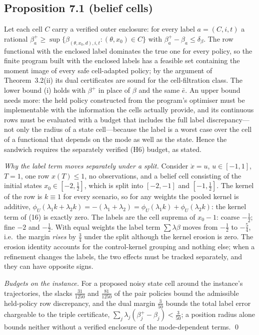 \documentclass[11pt,a4paper]{article}
\theoremstyle{plain}
\theoremstyle{definition}
\theoremstyle{remark}
\newcommand{\ebar}{\bar e}
\newcommand{\tfr}[2]{\tfrac{#1}{#2}}
\begin{document}
\subsection{Proposition 7.1 (belief cells)}
Let each cell $C$ carry a verified outer enclosure: for every label $a=(C,i,t)$ a rational $\beta_a^+\ge\sup\{\beta_{(\theta,x_0,d),i,t}:(\theta,x_0)\in C\}$ with $\beta^+_a-\beta_a\le\delta_\beta$. The row functional with the enclosed label dominates the true one for every policy, so the finite program built with the enclosed labels has a feasible set containing the moment image of every safe cell-adapted policy; by the argument of Theorem~3.2(ii) its dual certificates are sound for the cell-filtration class. The lower bound (i) holds with $\beta^+$ in place of $\beta$ and the same $\ebar$. An upper bound needs more: the held policy constructed from the program's optimiser must be implementable with the information the cells actually provide, and its continuous rows must be evaluated with a budget that includes the full label discrepancy---not only the radius of a state cell---because the label is a worst case over the cell of a functional that depends on the mode as well as the state. Hence the sandwich requires the separately verified (H6) budget, as stated.

\emph{Why the label term moves separately under a split.} Consider $\dot x=u$, $u\in[-1,1]$, $T=1$, one row $x(T)\le1$, no observations, and a belief cell consisting of the initial states $x_0\in[-2,\tfr12]$, which is split into $[-2,-1]$ and $[-1,\tfr12]$. The kernel of the row is $k\equiv1$ for every scenario, so for any weights the pooled kernel is additive, $\phi_U(\lambda_1k+\lambda_2k)=-(\lambda_1+\lambda_2)=\phi_U(\lambda_1k)+\phi_U(\lambda_2k)$: the kernel term of (16) is exactly zero. The labels are the cell suprema of $x_0-1$: coarse $-\tfr12$; fine $-2$ and $-\tfr12$. With equal weights the label term $\sum\lambda\beta$ moves from $-\tfr12$ to $-\tfr54$, i.e.\ the margin \emph{rises} by $\tfr34$ under the split although the kernel erosion is zero. The erosion identity accounts for the control-kernel grouping and nothing else; when a refinement changes the labels, the two effects must be tracked separately, and they can have opposite signs.

\emph{Budgets on the instance.} For a proposed noisy state cell around the instance's trajectories, the slacks $\tfr{31}{1250}$ and $\tfr{81}{1250}$ of the pair policies bound the admissible held-policy row discrepancy, and the dual margin $\tfr3{50}$ bounds the total label error chargeable to the triple certificate, $\sum_j\lambda_j(\beta^+_j-\beta_j)<\tfr3{50}$; a position radius alone bounds neither without a verified enclosure of the mode-dependent terms. \qed
\end{document}
